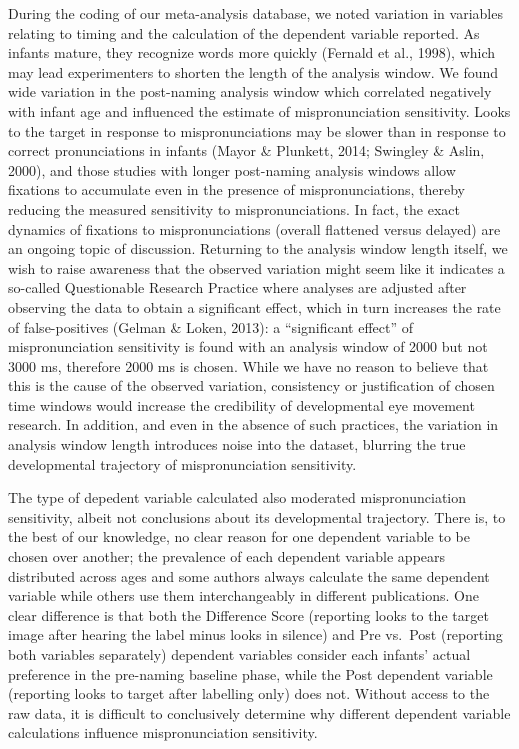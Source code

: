 \documentclass[
  english,
  man, noextraspace]{apa6}
\begin{document}
During the coding of our meta-analysis database, we noted variation in variables relating to timing and the calculation of the dependent variable reported. As infants mature, they recognize words more quickly (Fernald et al., 1998), which may lead experimenters to shorten the length of the analysis window. We found wide variation in the post-naming analysis window which correlated negatively with infant age and influenced the estimate of mispronunciation sensitivity. Looks to the target in response to mispronunciations may be slower than in response to correct pronunciations in infants (Mayor \& Plunkett, 2014; Swingley \& Aslin, 2000), and those studies with longer post-naming analysis windows allow fixations to accumulate even in the presence of mispronunciations, thereby reducing the measured sensitivity to mispronunciations. In fact, the exact dynamics of fixations to mispronunciations (overall flattened versus delayed) are an ongoing topic of discussion. Returning to the analysis window length itself, we wish to raise awareness that the observed variation might seem like it indicates a so-called Questionable Research Practice where analyses are adjusted after observing the data to obtain a significant effect, which in turn increases the rate of false-positives (Gelman \& Loken, 2013): a ``significant effect'' of mispronunciation sensitivity is found with an analysis window of 2000 but not 3000 ms, therefore 2000 ms is chosen. While we have no reason to believe that this is the cause of the observed variation, consistency or justification of chosen time windows would increase the credibility of developmental eye movement research. In addition, and even in the absence of such practices, the variation in analysis window length introduces noise into the dataset, blurring the true developmental trajectory of mispronunciation sensitivity.

The type of depedent variable calculated also moderated mispronunciation sensitivity, albeit not conclusions about its developmental trajectory. There is, to the best of our knowledge, no clear reason for one dependent variable to be chosen over another; the prevalence of each dependent variable appears distributed across ages and some authors always calculate the same dependent variable while others use them interchangeably in different publications. One clear difference is that both the Difference Score (reporting looks to the target image after hearing the label minus looks in silence) and Pre vs.~Post (reporting both variables separately) dependent variables consider each infants' actual preference in the pre-naming baseline phase, while the Post dependent variable (reporting looks to target after labelling only) does not. Without access to the raw data, it is difficult to conclusively determine why different dependent variable calculations influence mispronunciation sensitivity.
\end{document}
